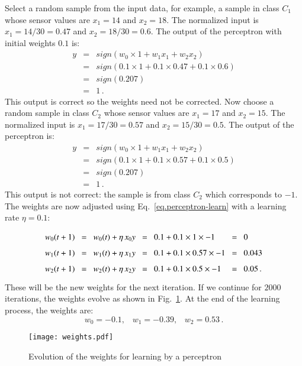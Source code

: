 Select a random sample from the input data, for example, a sample in class $C_1$ whose sensor values are $x_{1}=14$ and $x_{2}=18$. The normalized input is $x_{1}=14/30=0.47$ and $x_{2}=18/30=0.6$. The output of the perceptron with initial weights $0.1$ is:
\begin{eqnarray*}
y &=& \mathit{sign}(w_0\times 1 + w_1x_1 + w_2x_2)\\
&=& \mathit{sign}(0.1\times 1 + 0.1\times 0.47 + 0.1\times 0.6)\\
&=& \mathit{sign}(0.207)\\
&=& 1\,.
\end{eqnarray*}
This output is correct so the weights need not be corrected. Now choose a random sample in class $C_2$ whose sensor values are  $x_{1}=17$ and $x_{2}=15$. The normalized input is $x_{1}=17/30=0.57$ and $x_{2}=15/30=0.5$. The output of the perceptron is:
\begin{eqnarray*}
y &=& \mathit{sign}(w_0\times 1 + w_1x_1 + w_2x_2)\\
&=& \mathit{sign}(0.1\times 1 + 0.1\times 0.57 + 0.1\times 0.5)\\
&=& \mathit{sign}(0.207)\\
&=& 1\,.
\end{eqnarray*}
This output is not correct: the sample is from class $C_2$ which corresponds to $-1$. The weights are now adjusted using Eq.~\ref{eq.perceptron-learn} with a learning rate $\eta = 0.1$:
\[
\spacearray
\begin{array}{lclclcl}
w_0(t+1) &=& w_0(t) + \eta \,x_0 y &=& 0.1 + 0.1\times 1\times -1 &=& 0 \\
w_1(t+1) &=& w_1(t) + \eta \,x_1 y &=& 0.1 + 0.1\times 0.57\times-1 &=& 0.043 \\
w_2(t+1) &=& w_2(t) + \eta \,x_2 y &=& 0.1 + 0.1\times 0.5\times -1 &=& 0.05\,.
\end{array}
\]
These will be the new weights for the next iteration. If we continue for $2000$ iterations, the weights evolve as shown in Fig.~\ref{fig.weights-fixeta}. At the end of the learning process, the weights are:
\[
w_0 = -0.1,\;\;\; w_1 = -0.39,\;\;\; w_2 = 0.53\,.
\]

\begin{figure}[bt]
\begin{center}
\texttt{[image: weights.pdf]}
\end{center}
\caption{Evolution of the weights for learning by a perceptron}\label{fig.weights-fixeta}
\end{figure}

